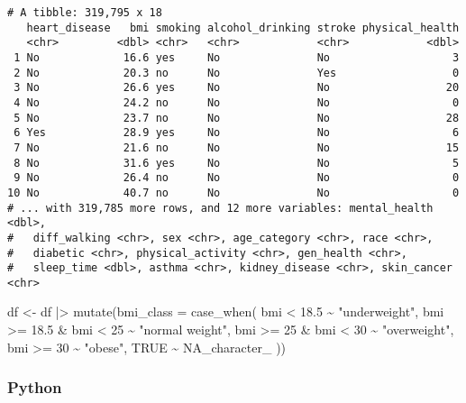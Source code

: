 \documentclass[
  letterpaper,
  DIV=11,
  numbers=noendperiod]{scrreprt}
\newenvironment{Shaded}{\begin{snugshade}}{\end{snugshade}}
\newcommand{\AttributeTok}[1]{\textcolor[rgb]{0.40,0.46,0.14}{#1}}
\newcommand{\ConstantTok}[1]{\textcolor[rgb]{0.56,0.35,0.01}{#1}}
\newcommand{\DecValTok}[1]{\textcolor[rgb]{0.68,0.00,0.00}{#1}}
\newcommand{\FloatTok}[1]{\textcolor[rgb]{0.68,0.00,0.00}{#1}}
\newcommand{\FunctionTok}[1]{\textcolor[rgb]{0.28,0.35,0.67}{#1}}
\newcommand{\NormalTok}[1]{\textcolor[rgb]{0.00,0.46,0.62}{#1}}
\newcommand{\OtherTok}[1]{\textcolor[rgb]{0.00,0.46,0.62}{#1}}
\newcommand{\SpecialCharTok}[1]{\textcolor[rgb]{0.37,0.37,0.37}{#1}}
\newcommand{\StringTok}[1]{\textcolor[rgb]{0.13,0.47,0.30}{#1}}
\begin{document}
\begin{verbatim}
# A tibble: 319,795 x 18
   heart_disease   bmi smoking alcohol_drinking stroke physical_health
   <chr>         <dbl> <chr>   <chr>            <chr>            <dbl>
 1 No             16.6 yes     No               No                   3
 2 No             20.3 no      No               Yes                  0
 3 No             26.6 yes     No               No                  20
 4 No             24.2 no      No               No                   0
 5 No             23.7 no      No               No                  28
 6 Yes            28.9 yes     No               No                   6
 7 No             21.6 no      No               No                  15
 8 No             31.6 yes     No               No                   5
 9 No             26.4 no      No               No                   0
10 No             40.7 no      No               No                   0
# ... with 319,785 more rows, and 12 more variables: mental_health <dbl>,
#   diff_walking <chr>, sex <chr>, age_category <chr>, race <chr>,
#   diabetic <chr>, physical_activity <chr>, gen_health <chr>,
#   sleep_time <dbl>, asthma <chr>, kidney_disease <chr>, skin_cancer <chr>
\end{verbatim}

\begin{Shaded}
\begin{Highlighting}[]
\NormalTok{df }\OtherTok{\textless{}{-}}\NormalTok{ df }\SpecialCharTok{|\textgreater{}} \FunctionTok{mutate}\NormalTok{(}\AttributeTok{bmi\_class =} \FunctionTok{case\_when}\NormalTok{(}
\NormalTok{    bmi }\SpecialCharTok{\textless{}} \FloatTok{18.5} \SpecialCharTok{\textasciitilde{}} \StringTok{"underweight"}\NormalTok{,}
\NormalTok{    bmi }\SpecialCharTok{\textgreater{}=} \FloatTok{18.5} \SpecialCharTok{\&}\NormalTok{ bmi }\SpecialCharTok{\textless{}} \DecValTok{25} \SpecialCharTok{\textasciitilde{}} \StringTok{"normal weight"}\NormalTok{,}
\NormalTok{    bmi }\SpecialCharTok{\textgreater{}=} \DecValTok{25} \SpecialCharTok{\&}\NormalTok{ bmi }\SpecialCharTok{\textless{}} \DecValTok{30} \SpecialCharTok{\textasciitilde{}} \StringTok{"overweight"}\NormalTok{,}
\NormalTok{    bmi }\SpecialCharTok{\textgreater{}=} \DecValTok{30} \SpecialCharTok{\textasciitilde{}} \StringTok{"obese"}\NormalTok{,}
    \ConstantTok{TRUE} \SpecialCharTok{\textasciitilde{}} \ConstantTok{NA\_character\_}
\NormalTok{))}
\end{Highlighting}
\end{Shaded}

\hypertarget{python-25}{%
\subsubsection{Python}\label{python-25}}
\end{document}
